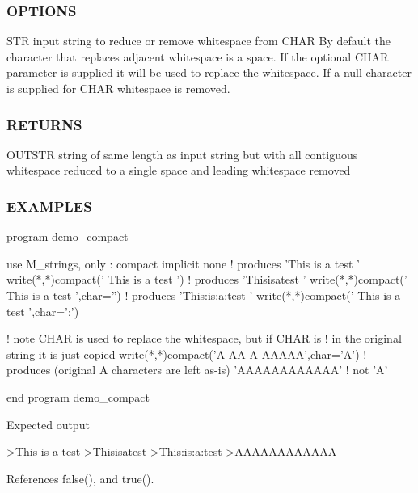 \subsubsection*{O\+P\+T\+I\+O\+NS}

S\+TR input string to reduce or remove whitespace from C\+H\+AR By default the character that replaces adjacent whitespace is a space. If the optional C\+H\+AR parameter is supplied it will be used to replace the whitespace. If a null character is supplied for C\+H\+AR whitespace is removed. \subsubsection*{R\+E\+T\+U\+R\+NS}

O\+U\+T\+S\+TR string of same length as input string but with all contiguous whitespace reduced to a single space and leading whitespace removed

\subsubsection*{E\+X\+A\+M\+P\+L\+ES}

\begin{DoxyVerb}program demo_compact

 use M_strings, only : compact
 implicit none
 ! produces 'This is a test               '
 write(*,*)compact('  This     is      a     test  ')
 ! produces 'Thisisatest                  '
 write(*,*)compact('  This     is      a     test  ',char='')
 ! produces 'This:is:a:test               '
 write(*,*)compact('  This     is      a     test  ',char=':')

 ! note CHAR is used to replace the whitespace, but if CHAR is
 ! in the original string it is just copied
 write(*,*)compact('A  AA    A   AAAAA',char='A')
 ! produces (original A characters are left as-is) 'AAAAAAAAAAAA'
 ! not 'A'

end program demo_compact

Expected output

 >This is a test
 >Thisisatest
 >This:is:a:test
 >AAAAAAAAAAAA \end{DoxyVerb}
 

References false(), and true().

